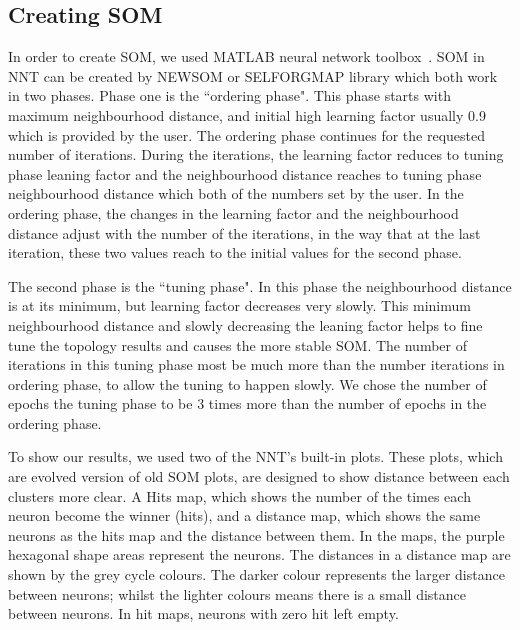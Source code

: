 \documentclass[useAMS,usenatbib]{mn2e}
\begin{document}
\subsection{Creating SOM}
\label{sec: create_som}
     In order to create SOM, we used {\tiny MATLAB} neural network 
     toolbox~\citep[NNT,][]{matlabtolbox}.
     SOM in {\tiny NNT} can be created by {\tiny NEWSOM} or {\tiny SELFORGMAP} library which both work in two phases. 
     Phase one is the ``ordering phase". 
     This phase starts with maximum neighbourhood distance, and initial high learning factor usually 0.9 which is provided by the user. 
     The ordering phase continues for the requested number of iterations.
     During the iterations, the learning factor reduces to tuning phase leaning factor and the neighbourhood distance reaches to tuning phase neighbourhood distance which both of the numbers set by the user.
     In the ordering phase, the changes in the learning factor and the neighbourhood distance adjust with the number of the iterations, in the way that at the last iteration, these two values reach to the initial values for the second phase.
     
     The second phase is the ``tuning phase".
     In this phase the neighbourhood distance is at its minimum, but learning factor decreases very slowly.
     This minimum neighbourhood distance and slowly decreasing the leaning factor helps to fine tune the topology results and causes the more stable SOM. 
     The number of iterations in this tuning phase most be much more than the number iterations in ordering phase, to allow the tuning to happen slowly. %
     We chose the number of epochs the tuning phase to be 3 times more than the number of epochs in the ordering phase.
     
     To show our results, we used two of the {\tiny NNT}'s built-in plots.
     These plots, which are evolved version of old SOM plots, are designed to show distance between each clusters more clear.
     A Hits map, which shows the number of the times each neuron become the winner (hits), and a distance map, which shows the same neurons as the hits map and the distance between them.
     In the maps, the purple hexagonal shape areas represent the neurons.
     The distances in a distance map are shown by the grey cycle colours.
     The darker colour represents the larger distance between neurons; whilst the lighter colours means there is a small distance between neurons.
     In hit maps, neurons with zero hit left empty.
      
\end{document}
